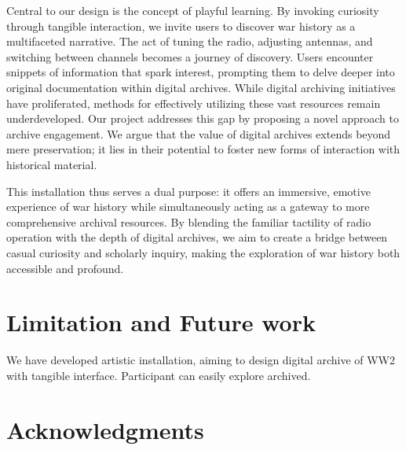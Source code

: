 \documentclass[sigconf,authordraft]{acmart}
\begin{document}
Central to our design is the concept of playful learning. By invoking curiosity through tangible interaction, we invite users to discover war history as a multifaceted narrative. The act of tuning the radio, adjusting antennas, and switching between channels becomes a journey of discovery. Users encounter snippets of information that spark interest, prompting them to delve deeper into original documentation within digital archives.
While digital archiving initiatives have proliferated, methods for effectively utilizing these vast resources remain underdeveloped. Our project addresses this gap by proposing a novel approach to archive engagement. We argue that the value of digital archives extends beyond mere preservation; it lies in their potential to foster new forms of interaction with historical material.

This installation thus serves a dual purpose: it offers an immersive, emotive experience of war history while simultaneously acting as a gateway to more comprehensive archival resources. By blending the familiar tactility of radio operation with the depth of digital archives, we aim to create a bridge between casual curiosity and scholarly inquiry, making the exploration of war history both accessible and profound.

\section{Limitation and Future work}
We have developed artistic installation, aiming to design digital archive of WW2 with tangible interface. Participant can easily explore archived. 


\section{Acknowledgments}




\end{document}
